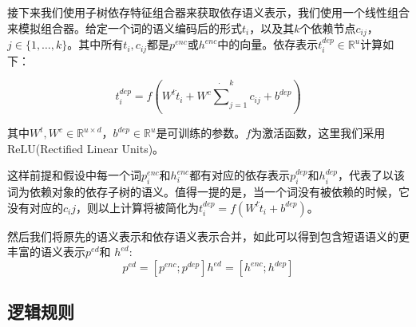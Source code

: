 \documentclass[UTF8,11pt,a4paper,nofonts]{ctexart}
\begin{document}


接下来我们使用子树依存特征组合器来获取依存语义表示，我们使用一个线性组合来模拟组合器。给定一个词的语义编码后的形式$t_{i}$，以及其$k$个依赖节点$c_{ij}$，$j \in \{1,\dots,k\}$。其中所有$t_{i}, c_{ij}$都是$p^{enc}$或$h^{enc}$中的向量。依存表示$t^{dep}_i \in \mathbb{R}^u$计算如下：

\begin{equation}

t^{dep}_i = f(W^t \dot t_i + W^c \dot \sum^{k}_{j=1}c_{ij} + b^{dep})

\end{equation}

其中$W^t, W^c \in \mathbb{R}^{u \times d}$，$b^{dep} \in \mathbb{R}^{u}$是可训练的参数。$f$为激活函数，这里我们采用ReLU(Rectified Linear Units)。

这样前提和假设中每一个词$p^{enc}_i$和$h^{enc}_i$都有对应的依存表示$p^{dep}_i$和$h^{dep}_i$，代表了以该词为依赖对象的依存子树的语义。值得一提的是，当一个词没有被依赖的时候，它没有对应的$c_ij$，则以上计算将被简化为$t^{dep}_i = f(W^t \dot t_i + b^{dep})$。

然后我们将原先的语义表示和依存语义表示合并，如此可以得到包含短语语义的更丰富的语义表示$p^{ed}$和 $h^{ed}$:
\begin{equation}

p^{ed} = [p^{enc}; p^{dep}]

h^{ed} = [h^{enc}; h^{dep}]

\end{equation}


\subsection{逻辑规则}

\end{document}

